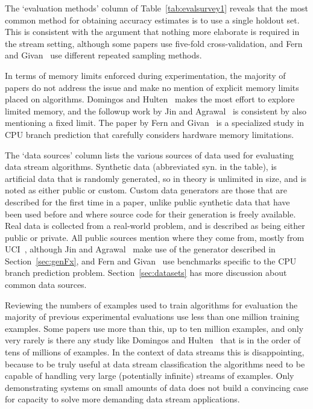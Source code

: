 The `evaluation methods' column of Table~\ref{tab:evalsurvey1} reveals that the most common method for obtaining accuracy estimates is to use a single holdout set. This is consistent with the argument that nothing more elaborate is required in the stream setting, although some papers use five-fold cross-validation, and Fern and Givan~\cite{branchpred} use different repeated sampling methods.

In terms of memory limits enforced during experimentation, the majority of papers do not address the issue and make no mention of explicit memory limits placed on algorithms. Domingos and Hulten~\cite{vfdt} makes the most effort to explore limited memory, and the followup work by Jin and Agrawal~\cite{nip} is consistent by also mentioning a fixed limit. The paper by Fern and Givan~\cite{branchpred} is a specialized study in CPU branch prediction that carefully considers hardware memory limitations.

The `data sources' column lists the various sources of data used for evaluating data stream algorithms. Synthetic data (abbreviated syn. in the table), is artificial data that is randomly generated, so in theory is unlimited in size, and is noted as either public or custom. Custom data generators are those that are described for the first time in a paper, unlike public synthetic data that have been used before and where source code for their generation is freely available. Real data is collected from a real-world problem, and is described as being either public or private. All public sources mention where they come from, mostly from UCI~\cite{uci}, although Jin and Agrawal~\cite{nip} make use of the generator described in Section~\ref{sec:genFx}, and Fern and Givan~\cite{branchpred} use benchmarks specific to the CPU branch prediction problem. Section~\ref{sec:datasets} has more discussion about common data sources.

Reviewing the numbers of examples used to train algorithms for evaluation the majority of previous experimental evaluations use less than one million training examples. Some papers use more than this, up to ten million examples, and only very rarely is there any study like Domingos and Hulten~\cite{vfdt} that is in the order of tens of millions of examples. In the context of data streams this is disappointing, because to be truly useful at data stream classification the algorithms need to be capable of handling very large (potentially infinite) streams of examples. Only demonstrating systems on small amounts of data does not build a convincing case for capacity to solve more demanding data stream applications.


